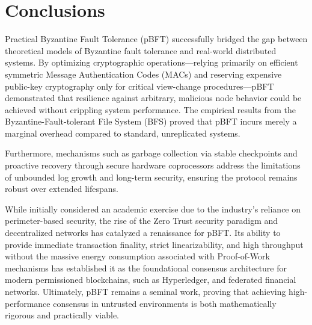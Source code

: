 \section{Conclusions}

Practical Byzantine Fault Tolerance (pBFT) successfully bridged the gap between theoretical models of Byzantine fault tolerance and real-world distributed systems. By optimizing cryptographic operations---relying primarily on efficient symmetric Message Authentication Codes (MACs) and reserving expensive public-key cryptography only for critical view-change procedures---pBFT demonstrated that resilience against arbitrary, malicious node behavior could be achieved without crippling system performance. The empirical results from the Byzantine-Fault-tolerant File System (BFS) proved that pBFT incurs merely a marginal overhead compared to standard, unreplicated systems.

Furthermore, mechanisms such as garbage collection via stable checkpoints and proactive recovery through secure hardware coprocessors address the limitations of unbounded log growth and long-term security, ensuring the protocol remains robust over extended lifespans. 

While initially considered an academic exercise due to the industry's reliance on perimeter-based security, the rise of the Zero Trust security paradigm and decentralized networks has catalyzed a renaissance for pBFT. Its ability to provide immediate transaction finality, strict linearizability, and high throughput without the massive energy consumption associated with Proof-of-Work mechanisms has established it as the foundational consensus architecture for modern permissioned blockchains, such as Hyperledger, and federated financial networks. Ultimately, pBFT remains a seminal work, proving that achieving high-performance consensus in untrusted environments is both mathematically rigorous and practically viable.